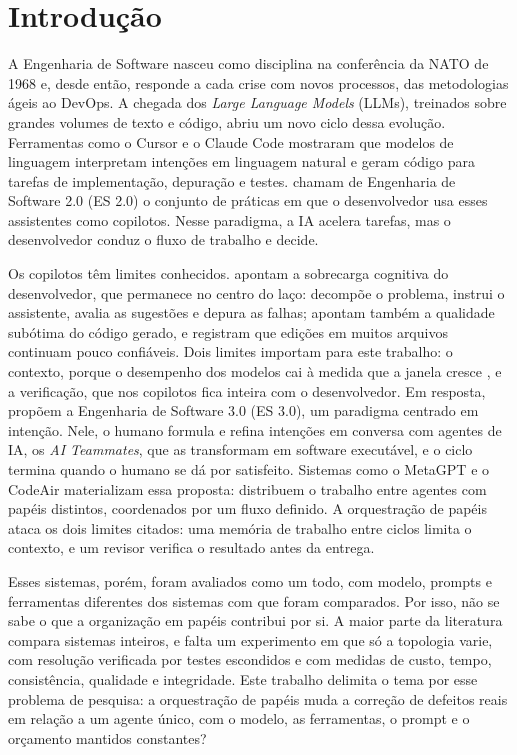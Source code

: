 \section{Introdução}
\label{introducao}

A Engenharia de Software nasceu como disciplina na conferência da NATO de 1968 \citep{Naur1969NATO} e, desde então, responde a cada crise com novos processos, das metodologias ágeis ao DevOps. A chegada dos \textit{Large Language Models} (LLMs), treinados sobre grandes volumes de texto e código, abriu um novo ciclo dessa evolução. Ferramentas como o Cursor \citep{Cursor2022} e o Claude Code \citep{ClaudeCode2025} mostraram que modelos de linguagem interpretam intenções em linguagem natural e geram código para tarefas de implementação, depuração e testes. \cite{ES302024} chamam de Engenharia de Software 2.0 (ES 2.0) o conjunto de práticas em que o desenvolvedor usa esses assistentes como copilotos. Nesse paradigma, a IA acelera tarefas, mas o desenvolvedor conduz o fluxo de trabalho e decide.

Os copilotos têm limites conhecidos. \cite{ES302024} apontam a sobrecarga cognitiva do desenvolvedor, que permanece no centro do laço: decompõe o problema, instrui o assistente, avalia as sugestões e depura as falhas; apontam também a qualidade subótima do código gerado, e registram que edições em muitos arquivos continuam pouco confiáveis. Dois limites importam para este trabalho: o contexto, porque o desempenho dos modelos cai à medida que a janela cresce \citep{Levy2024SameTask, Liu2024LostInTheMiddle}, e a verificação, que nos copilotos fica inteira com o desenvolvedor. Em resposta, \cite{ES302024} propõem a Engenharia de Software 3.0 (ES 3.0), um paradigma centrado em intenção. Nele, o humano formula e refina intenções em conversa com agentes de IA, os \textit{AI Teammates}, que as transformam em software executável, e o ciclo termina quando o humano se dá por satisfeito. Sistemas como o MetaGPT \citep{MetaGPT2023} e o CodeAir \citep{CodeAir2025} materializam essa proposta: distribuem o trabalho entre agentes com papéis distintos, coordenados por um fluxo definido. A orquestração de papéis ataca os dois limites citados: uma memória de trabalho entre ciclos limita o contexto, e um revisor verifica o resultado antes da entrega.

Esses sistemas, porém, foram avaliados como um todo, com modelo, prompts e ferramentas diferentes dos sistemas com que foram comparados. Por isso, não se sabe o que a organização em papéis contribui por si. A maior parte da literatura compara sistemas inteiros, e falta um experimento em que só a topologia varie, com resolução verificada por testes escondidos e com medidas de custo, tempo, consistência, qualidade e integridade. Este trabalho delimita o tema por esse problema de pesquisa: a orquestração de papéis muda a correção de defeitos reais em relação a um agente único, com o modelo, as ferramentas, o prompt e o orçamento mantidos constantes?

